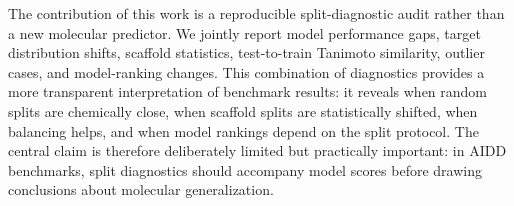 The contribution of this work is a reproducible split-diagnostic audit rather than a new molecular predictor. We jointly report model performance gaps, target distribution shifts, scaffold statistics, test-to-train Tanimoto similarity, outlier cases, and model-ranking changes. This combination of diagnostics provides a more transparent interpretation of benchmark results: it reveals when random splits are chemically close, when scaffold splits are statistically shifted, when balancing helps, and when model rankings depend on the split protocol. The central claim is therefore deliberately limited but practically important: in AIDD benchmarks, split diagnostics should accompany model scores before drawing conclusions about molecular generalization.
